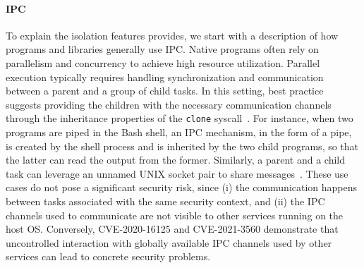 \paragraph{IPC}
To explain the isolation features \natisand provides, we start with a
description of how programs and libraries generally use IPC.
Native programs often rely on parallelism and concurrency to achieve
high resource utilization. Parallel execution typically requires
handling synchronization and communication between a parent and a group
of child tasks. In this setting, best practice suggests providing the
children with the necessary communication channels through the
inheritance properties of the {\tt clone} syscall~\cite{doc-pipe}. For
instance, when two programs are piped in the Bash shell, an IPC
mechanism, in the form of a pipe, is created by the shell process and
is inherited by the two child programs, so that the latter can read
the output from the former. Similarly, a parent and a child task can
leverage an unnamed UNIX socket pair to share
messages~\cite{doc-socketpair}. These use cases do not pose a
significant security risk, since (i) the communication happens between
tasks associated with the same security context, and (ii) the IPC
channels used to communicate are not visible to other services running
on the host OS. Conversely, CVE-2020-16125 and CVE-2021-3560
demonstrate that uncontrolled interaction with globally available IPC
channels used by other services can lead to concrete security
problems.

